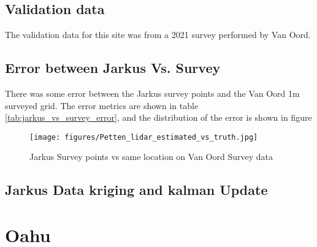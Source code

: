 \subsection{Validation data}
The validation data for this site was from a 2021 survey performed by Van Oord.
\subsection{Error between Jarkus Vs. Survey}
There was some error between the Jarkus survey points and the Van Oord 1m surveyed grid. The error metrics are shown in table \ref{tab:jarkus_vs_survey_error}, and the distribution of the error is shown in figure

\begin{figure}[h!]
    \centering
    \texttt{[image: figures/Petten\_lidar\_estimated\_vs\_truth.jpg]}
    \caption{Jarkus Survey points vs same location on Van Oord Survey data}
    \label{fig:jarkus_vs_survey}
\end{figure}

\subsection{Jarkus Data kriging and kalman Update}

\section{Oahu}

